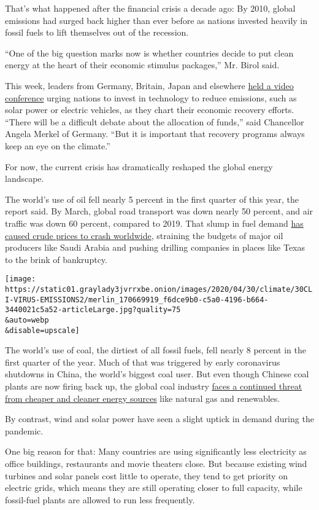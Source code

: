That's what happened after the financial crisis a decade ago: By 2010,
global emissions had surged back higher than ever before as nations
invested heavily in fossil fuels to lift themselves out of the
recession.

``One of the big question marks now is whether countries decide to put
clean energy at the heart of their economic stimulus packages,'' Mr.
Birol said.

This week, leaders from Germany, Britain, Japan and elsewhere
\href{https://www.bmu.de/en/event/petersberg-climate-dialogue-xi/}{held
a video conference} urging nations to invest in technology to reduce
emissions, such as solar power or electric vehicles, as they chart their
economic recovery efforts. ``There will be a difficult debate about the
allocation of funds,'' said Chancellor Angela Merkel of Germany. ``But
it is important that recovery programs always keep an eye on the
climate.''

For now, the current crisis has dramatically reshaped the global energy
landscape.

The world's use of oil fell nearly 5 percent in the first quarter of
this year, the report said. By March, global road transport was down
nearly 50 percent, and air traffic was down 60 percent, compared to
2019. That slump in fuel demand
\href{https://www.nytimes3xbfgragh.onion/2020/03/08/business/saudi-arabia-oil-prices.html}{has
caused crude prices to crash worldwide}, straining the budgets of major
oil producers like Saudi Arabia and pushing drilling companies in places
like Texas to the brink of bankruptcy.

\texttt{[image: https://static01.graylady3jvrrxbe.onion/images/2020/04/30/climate/30CLI-VIRUS-EMISSIONS2/merlin\_170669919\_f6dce9b0-c5a0-4196-b664-3440021c5a52-articleLarge.jpg?quality=75\\\&auto=webp\\\&disable=upscale]}

The world's use of coal, the dirtiest of all fossil fuels, fell nearly 8
percent in the first quarter of the year. Much of that was triggered by
early coronavirus shutdowns in China, the world's biggest coal user. But
even though Chinese coal plants are now firing back up, the global coal
industry
\href{https://www.nytimes3xbfgragh.onion/2019/11/12/climate/energy-trends-climate-change.html}{faces
a continued threat from cheaper and cleaner energy sources} like natural
gas and renewables.

By contrast, wind and solar power have seen a slight uptick in demand
during the pandemic.

One big reason for that: Many countries are using significantly less
electricity as office buildings, restaurants and movie theaters close.
But because existing wind turbines and solar panels cost little to
operate, they tend to get priority on electric grids, which means they
are still operating closer to full capacity, while fossil-fuel plants
are allowed to run less frequently.

